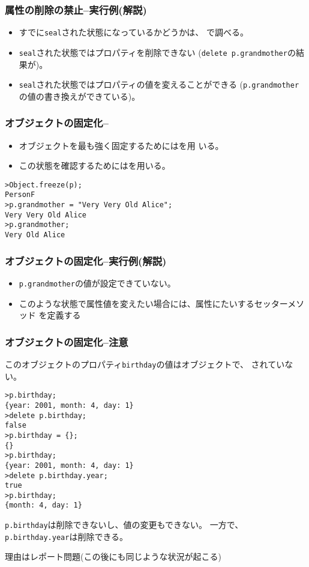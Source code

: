 \begin{frame}[containsverbatim]
 \frametitle{属性の削除の禁止--実行例(解説)}
\begin{itemize}
	 \item すでに\texttt{seal}された状態になっているかどうかは、
				 で調べる。
 \item \texttt{seal}された状態ではプロパティを削除できない
			 (\texttt{delete p.grandmother}の結果が)。
 \item \texttt{seal}された状態ではプロパティの値を変えることができる
			 (\texttt{p.grandmother}の値の書き換えができている)。
\end{itemize}
\end{frame}
\begin{frame}[containsverbatim]
 \frametitle{オブジェクトの固定化--\protect{}}
\begin{itemize}
 \item オブジェクトを最も強く固定するためにはを用
			 いる。
 \item この状態を確認するためにはを用いる。
\end{itemize}
\begin{Verbatim}
>Object.freeze(p);
PersonF
>p.grandmother = "Very Very Old Alice";
Very Very Old Alice
>p.grandmother;
Very Old Alice
\end{Verbatim}
\end{frame}
\begin{frame}[containsverbatim]
 \frametitle{オブジェクトの固定化--実行例(解説)}
 \begin{itemize}
  \item \texttt{p.grandmother}の値が設定できていない。
  \item このような状態で属性値を変えたい場合には、属性にたいするセッターメソッド
  を定義する
 \end{itemize}
\end{frame}
\begin{frame}[containsverbatim]
 \frametitle{オブジェクトの固定化--注意}
 このオブジェクトのプロパティ\texttt{birthday}の値はオブジェクトで、
 されていない。
 {\scriptsize
\begin{Verbatim}
>p.birthday;
{year: 2001, month: 4, day: 1}
>delete p.birthday;
false
>p.birthday = {};
{}
>p.birthday;
{year: 2001, month: 4, day: 1}
>delete p.birthday.year;
true
>p.birthday;
{month: 4, day: 1}
\end{Verbatim}
 }
 \texttt{p.birthday}は削除できないし、値の変更もできない。
 一方で、\texttt{p.birthday.year}は削除できる。

 理由はレポート問題(この後にも同じような状況が起こる)
\end{frame}
